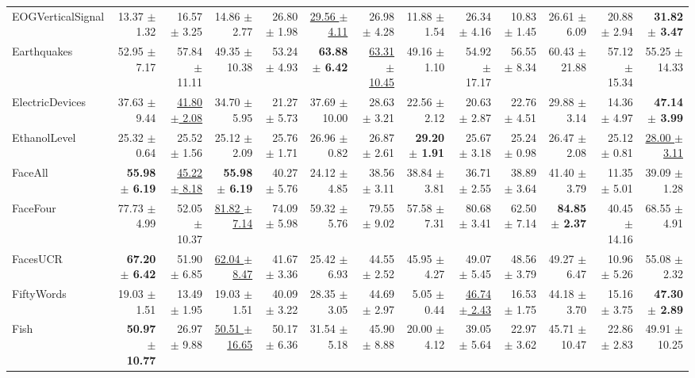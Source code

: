 \begin{landscape}
\begin{longtable}{lrrrrrrrrrrrr}
EOGVerticalSignal & 13.37 $\pm$ 1.32 & 16.57 $\pm$ 3.25 & 14.86 $\pm$ 2.77 & 26.80 $\pm$ 1.98 & \underline{29.56 $\pm$ 4.11} & 26.98 $\pm$ 4.28 & 11.88 $\pm$ 1.54 & 26.34 $\pm$ 4.16 & 10.83 $\pm$ 1.45 & 26.61 $\pm$ 6.09 & 20.88 $\pm$ 2.94 & \textbf{31.82 $\pm$ 3.47} \\
Earthquakes & 52.95 $\pm$ 7.17 & 57.84 $\pm$ 11.11 & 49.35 $\pm$ 10.38 & 53.24 $\pm$ 4.93 & \textbf{63.88 $\pm$ 6.42} & \underline{63.31 $\pm$ 10.45} & 49.16 $\pm$ 1.10 & 54.92 $\pm$ 17.17 & 56.55 $\pm$ 8.34 & 60.43 $\pm$ 21.88 & 57.12 $\pm$ 15.34 & 55.25 $\pm$ 14.33 \\
ElectricDevices & 37.63 $\pm$ 9.44 & \underline{41.80 $\pm$ 2.08} & 34.70 $\pm$ 5.95 & 21.27 $\pm$ 5.73 & 37.69 $\pm$ 10.00 & 28.63 $\pm$ 3.21 & 22.56 $\pm$ 2.12 & 20.63 $\pm$ 2.87 & 22.76 $\pm$ 4.51 & 29.88 $\pm$ 3.14 & 14.36 $\pm$ 4.97 & \textbf{47.14 $\pm$ 3.99} \\
EthanolLevel & 25.32 $\pm$ 0.64 & 25.52 $\pm$ 1.56 & 25.12 $\pm$ 2.09 & 25.76 $\pm$ 1.71 & 26.96 $\pm$ 0.82 & 26.87 $\pm$ 2.61 & \textbf{29.20 $\pm$ 1.91} & 25.67 $\pm$ 3.18 & 25.24 $\pm$ 0.98 & 26.47 $\pm$ 2.08 & 25.12 $\pm$ 0.81 & \underline{28.00 $\pm$ 3.11} \\
FaceAll & \textbf{55.98 $\pm$ 6.19} & \underline{45.22 $\pm$ 8.18} & \textbf{55.98 $\pm$ 6.19} & 40.27 $\pm$ 5.76 & 24.12 $\pm$ 4.85 & 38.56 $\pm$ 3.11 & 38.84 $\pm$ 3.81 & 36.71 $\pm$ 2.55 & 38.89 $\pm$ 3.64 & 41.40 $\pm$ 3.79 & 11.35 $\pm$ 5.01 & 39.09 $\pm$ 1.28 \\
FaceFour & 77.73 $\pm$ 4.99 & 52.05 $\pm$ 10.37 & \underline{81.82 $\pm$ 7.14} & 74.09 $\pm$ 5.98 & 59.32 $\pm$ 5.76 & 79.55 $\pm$ 9.02 & 57.58 $\pm$ 7.31 & 80.68 $\pm$ 3.41 & 62.50 $\pm$ 7.14 & \textbf{84.85 $\pm$ 2.37} & 40.45 $\pm$ 14.16 & 68.55 $\pm$ 4.91 \\
FacesUCR & \textbf{67.20 $\pm$ 6.42} & 51.90 $\pm$ 6.85 & \underline{62.04 $\pm$ 8.47} & 41.67 $\pm$ 3.36 & 25.42 $\pm$ 6.93 & 44.55 $\pm$ 2.52 & 45.95 $\pm$ 4.27 & 49.07 $\pm$ 5.45 & 48.56 $\pm$ 3.79 & 49.27 $\pm$ 6.47 & 10.96 $\pm$ 5.26 & 55.08 $\pm$ 2.32 \\
FiftyWords & 19.03 $\pm$ 1.51 & 13.49 $\pm$ 1.95 & 19.03 $\pm$ 1.51 & 40.09 $\pm$ 3.22 & 28.35 $\pm$ 3.05 & 44.69 $\pm$ 2.97 & 5.05 $\pm$ 0.44 & \underline{46.74 $\pm$ 2.43} & 16.53 $\pm$ 1.75 & 44.18 $\pm$ 3.70 & 15.16 $\pm$ 3.75 & \textbf{47.30 $\pm$ 2.89} \\
Fish & \textbf{50.97 $\pm$ 10.77} & 26.97 $\pm$ 9.88 & \underline{50.51 $\pm$ 16.65} & 50.17 $\pm$ 6.36 & 31.54 $\pm$ 5.18 & 45.90 $\pm$ 8.88 & 20.00 $\pm$ 4.12 & 39.05 $\pm$ 5.64 & 22.97 $\pm$ 3.62 & 45.71 $\pm$ 10.47 & 22.86 $\pm$ 2.83 & 49.91 $\pm$ 10.25 \\

\end{longtable}
\end{landscape}
